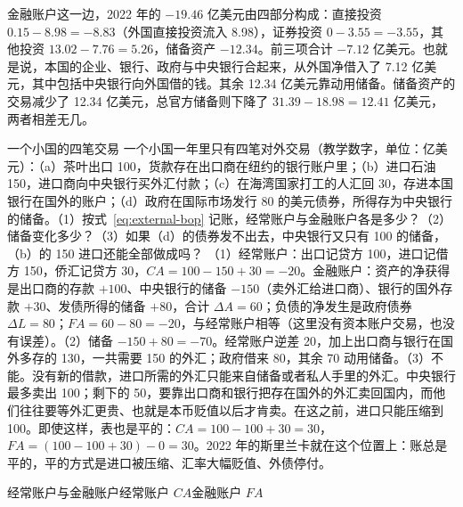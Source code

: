金融账户这一边，2022 年的 $-19.46$ 亿美元由四部分构成：直接投资 $0.15-8.98=-8.83$（外国直接投资流入 8.98），证券投资 $0-3.55=-3.55$，其他投资 $13.02-7.76=5.26$，储备资产 $-12.34$。前三项合计 $-7.12$ 亿美元。也就是说，本国的企业、银行、政府与中央银行合起来，从外国净借入了 7.12 亿美元，其中包括中央银行向外国借的钱。其余 12.34 亿美元靠动用储备。储备资产的交易减少了 12.34 亿美元，总官方储备则下降了 $31.39-18.98=12.41$ 亿美元，两者相差无几。

\begin{example}{一个小国的四笔交易}\label{ex:external-entries}
一个小国一年里只有四笔对外交易（教学数字，单位：亿美元）：（a）茶叶出口 100，货款存在出口商在纽约的银行账户里；（b）进口石油 150，进口商向中央银行买外汇付款；（c）在海湾国家打工的人汇回 30，存进本国银行在国外的账户；（d）政府在国际市场发行 80 的美元债券，所得存为中央银行的储备。（1）按式~\eqref{eq:external-bop} 记账，经常账户与金融账户各是多少？（2）储备变化多少？（3）如果（d）的债券发不出去，中央银行又只有 100 的储备，（b）的 150 进口还能全部做成吗？
\solution （1）经常账户：出口记贷方 100，进口记借方 150，侨汇记贷方 30，$\mathit{CA}=100-150+30=-20$。金融账户：资产的净获得是出口商的存款 $+100$、中央银行的储备 $-150$（卖外汇给进口商）、银行的国外存款 $+30$、发债所得的储备 $+80$，合计 $\Delta A=60$；负债的净发生是政府债券 $\Delta L=80$；$\mathit{FA}=60-80=-20$，与经常账户相等（这里没有资本账户交易，也没有误差）。（2）储备 $-150+80=-70$。经常账户逆差 20，加上出口商与银行在国外多存的 130，一共需要 150 的外汇；政府借来 80，其余 70 动用储备。（3）不能。没有新的借款，进口所需的外汇只能来自储备或者私人手里的外汇。中央银行最多卖出 100；剩下的 50，要靠出口商和银行把存在国外的外汇卖回国内，而他们往往要等外汇更贵、也就是本币贬值以后才肯卖。在这之前，进口只能压缩到 100。即使这样，表也是平的：$\mathit{CA}=100-100+30=30$，$\mathit{FA}=(100-100+30)-0=30$。2022 年的斯里兰卡就在这个位置上：账总是平的，平的方式是进口被压缩、汇率大幅贬值、外债停付。
\end{example}


\begin{compare}{经常账户与金融账户}{经常账户 $\mathit{CA}$}{金融账户 $\mathit{FA}$}
\end{compare}

